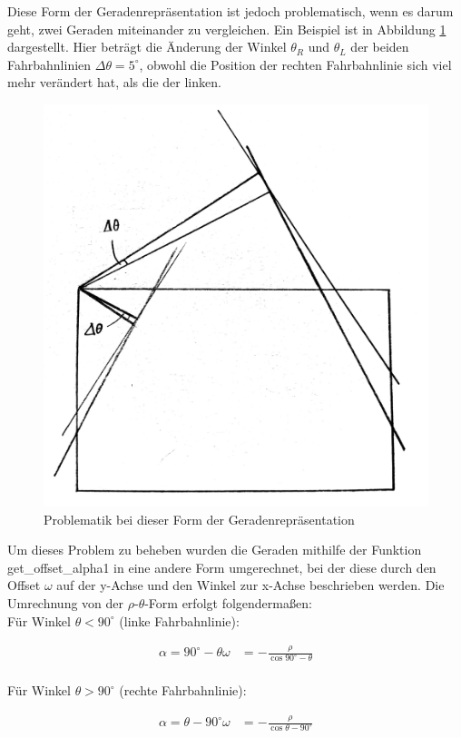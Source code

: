 	Diese Form der Geradenrepräsentation ist jedoch problematisch, wenn es darum geht, zwei Geraden miteinander zu vergleichen. Ein Beispiel ist in Abbildung \ref{fig:rho_theta2} dargestellt. Hier beträgt die Änderung der Winkel $\theta_R$ und $\theta_L$ der beiden Fahrbahnlinien $\Delta\theta=5^\circ$, obwohl die Position der rechten Fahrbahnlinie sich viel mehr verändert hat, als die der linken.
	
	
	
	\begin{figure}[H]
		\centering
		\includegraphics[width=.5\linewidth]{images/rho_theta2.jpg}
		\caption{Problematik bei dieser Form der Geradenrepräsentation}
		\label{fig:rho_theta2}
	\end{figure}

	Um dieses Problem zu beheben wurden die Geraden mithilfe der Funktion get\_offset\_alpha1 in eine andere Form umgerechnet, bei der diese durch den Offset $\omega$ auf der y-Achse und den Winkel zur x-Achse beschrieben werden. Die Umrechnung von der $\rho$-$\theta$-Form erfolgt folgendermaßen:\\

	
	
	Für Winkel $\theta<90^\circ$ (linke Fahrbahnlinie):
	
	\begin{align*}
	\alpha=90^{\circ}-\theta
	\omega&=-\frac{\rho}{\cos{90^{\circ}-\theta}} \\
	\end{align*}
	
	Für Winkel $\theta>90^\circ$ (rechte Fahrbahnlinie):
	
	\begin{align*}
	\alpha=\theta-90^{\circ}
	\omega&=-\frac{\rho}{\cos{\theta-90^{\circ}}} \\
	\end{align*}
	
